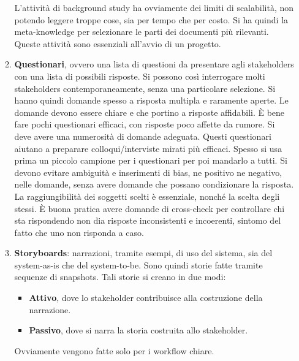 \begin{itemize}
\begin{enumerate}
                    L'attività di background study ha ovviamente dei limiti di scalabilità,
                    non potendo leggere troppe cose, sia per tempo che per costo. Si ha quindi
                    la meta-knowledge per selezionare le parti dei documenti più rilevanti.
                    Queste attività sono essenziali all'avvio di un progetto.
              \item \textbf{Questionari}, ovvero una lista di questioni da presentare
                    agli stakeholders con una lista di possibili risposte. Si possono così
                    interrogare molti stakeholders contemporaneamente, senza una particolare
                    selezione. Si hanno quindi domande spesso a risposta multipla e raramente
                    aperte. Le domande devono essere chiare e che portino a risposte
                    affidabili. È bene fare pochi questionari efficaci, con risposte poco
                    affette da rumore. Si deve avere una numerosità di domande adeguata.
                    Questi questionari aiutano a preparare colloqui/interviste mirati più
                    efficaci. Spesso si usa prima un piccolo campione per i questionari per
                    poi mandarlo a tutti. Si devono evitare ambiguità e inserimenti di
                    bias, ne positivo ne negativo, nelle domande, senza avere domande che
                    possano condizionare la risposta. La raggiungibilità dei soggetti scelti
                    è essenziale, nonché la scelta degli stessi. È buona pratica avere domande
                    di cross-check per controllare chi sta rispondendo non dia risposte
                    inconsistenti e incoerenti, sintomo del fatto che uno non risponda a
                    caso.
              \item \textbf{Storyboards}: narrazioni, tramite esempi, di uso del sistema,
                    sia del system-as-is che del system-to-be. Sono quindi storie fatte tramite
                    sequenze di snapshots. Tali storie si creano in due modi:
                    \begin{itemize}
                        \item \textbf{Attivo}, dove lo stakeholder contribuisce alla costruzione
                              della narrazione.
                        \item \textbf{Passivo}, dove si narra la storia costruita allo
                              stakeholder.
                    \end{itemize}
                    Ovviamente vengono fatte solo per i workflow chiare.

\end{enumerate}
\end{itemize}
